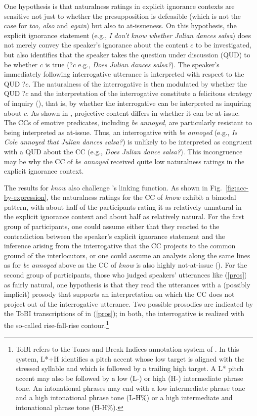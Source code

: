 \documentclass[11pt,fleqn]{article}
\newcommand{\6}{\mbox{$[\hspace*{-.6mm}[$}}
\newcommand{\9}{\mbox{$]\hspace*{-.6mm}]$}}
\newcommand{\citepos}[1]{\citeauthor{#1}'s \citeyear{#1}}
\begin{document}
One hypothesis is that naturalness ratings in explicit ignorance contexts are sensitive not just to whether the presupposition is defeasible (which is not the case for {\em too, also} and {\em again}) but also to at-issueness. On this hypothesis, the explicit ignorance statement (e.g., {\em I don't know whether Julian dances salsa}) does not merely convey the speaker's ignorance about the content $c$ to be investigated, but also identifies that the speaker takes the question under discussion (QUD) to be whether $c$ is true (?$c$ e.g., {\em Does Julian dances salsa?}). The speaker's immediately following interrogative utterance is interpreted with respect to the QUD ?$c$. The naturalness of the interrogative is then modulated by whether the QUD ?$c$  and the interpretation of the interrogative constitute a felicitous strategy of inquiry (\citealt[32f.]{roberts12}), that is,  by whether the interrogative can be interpreted as inquiring about $c$. As shown in \citealt{tbd-variability}, projective content differs in whether it can be at-issue. The CCs of emotive predicates, including {\em be annoyed}, are particularly resistant to being interpreted as at-issue. Thus, an interrogative with {\em be annoyed} (e.g., {\em Is Cole annoyed that Julian dances salsa?}) is unlikely to be interpreted as congruent with a QUD about the CC (e.g., {\em Does Julian dance salsa?}). This incongruence may be why the CC of {\em be annoyed} received quite low naturalness ratings in the explicit ignorance context.

The results for {\em know} also challenge \citepos{mandelkern-etal2020} linking function. As shown in Fig.~\ref{fig:acc-by-expression}, the naturalness ratings for the CC of {\em know} exhibit a bimodal pattern, with about half of the participants rating it as relatively unnatural in the explicit ignorance context and about half as relatively natural. For the first group of participants, one could assume either that they reacted to the contradiction between the speaker's explicit ignorance statement and the inference arising from the interrogative that the CC projects to the common ground of the interlocutors, or one could assume an analysis along the same lines as for {\em be annoyed} above as the CC of {\em know} is also highly not-at-issue (\citealt{tbd-variability}). For the second group of participants, those who judged speakers' utterances like (\ref{pros}) as fairly natural, one hypothesis is that they read the utterances with a (possibly implicit) prosody that supports an interpretation on which the CC does not project out of the interrogative utterance. Two possible prosodies are indicated by the ToBI transcriptions of in (\ref{pros}); in both, the interrogative is realized with the so-called rise-fall-rise contour.\footnote{ToBI refers to the Tones and Break Indices annotation system of \citealt{beckman-ayers97}. In this system, L*+H identifies a pitch accent whose low target is aligned with the stressed syllable and which is followed by a trailing high target. A L* pitch accent may also be followed by a low (L-) or high (H-) intermediate phrase tone. An intonational phrases may end with a low intermediate phrase tone and a high intonational phrase tone (L-H\%) or a high intermediate and intonational phrase tone (H-H\%).}
\end{document}
